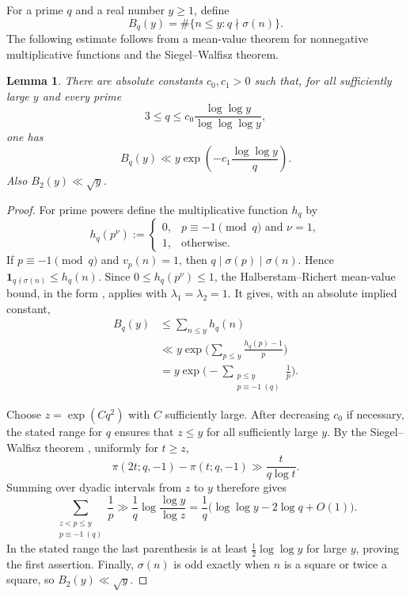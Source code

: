 \documentclass[11pt,letterpaper,reqno]{amsart}
\numberwithin{equation}{section}
\newtheorem{lemma}[theorem]{Lemma}
\theoremstyle{remark}
\newcommand{\1}{\mathbf 1}
\renewcommand{\leq}{\leqslant}
\renewcommand{\geq}{\geqslant}
\begin{document}
For a prime $q$ and a real number $y\geq1$, define
\[
 B_q(y)=\#\{n\leq y:q\nmid\sigma(n)\}.
\]
The following
estimate follows from a mean-value theorem for nonnegative multiplicative
functions and the Siegel--Walfisz theorem.

\begin{lemma}\label{lem:sigma-rate}
There are absolute constants $c_0,c_1>0$ such that, for all sufficiently
large $y$ and every prime
\[
 3\leq q\leq c_0\frac{\log\log y}{\log\log\log y},
\]
one has
\[
 B_q(y)\ll y\exp\!\left(-c_1\frac{\log\log y}q\right).
\]
Also $B_2(y)\ll\sqrt y$.
\end{lemma}

\begin{proof}
For prime powers define the multiplicative function $h_q$ by
\[
 h_q(p^\nu):=
 \begin{cases}
 0,& p\equiv-1\pmod q\text{ and }\nu=1,\\
 1,& \text{otherwise}.
 \end{cases}
\]
If $p\equiv-1\pmod q$ and $v_p(n)=1$, then
$q\mid\sigma(p)\mid\sigma(n)$. Hence
$\1_{q\nmid\sigma(n)}\leq h_q(n)$. Since $0\leq h_q(p^\nu)\leq1$,
the Halberstam--Richert mean-value bound, in the form
\cite[Lemma~2.4]{Pollack}, applies with $\lambda_1=\lambda_2=1$.
It gives, with an absolute implied constant,
\begin{align*}
 B_q(y)
 &\leq\sum_{n\leq y}h_q(n)\\
 &\ll y\exp\bigg(\sum_{p\leq y}\frac{h_q(p)-1}{p}\bigg)\\
 &=y\exp\bigg(-\sum_{\substack{p\leq y\\p\equiv-1\ (q)}}\frac1p\bigg).
\end{align*}

Choose $z=\exp(Cq^2)$ with $C$ sufficiently large. After decreasing
$c_0$ if necessary, the stated range for $q$ ensures that $z\leq y$ for
all sufficiently large $y$. By the Siegel--Walfisz theorem \cite{Tenenbaum}, uniformly for
$t\geq z$,
\[
 \pi(2t;q,-1)-\pi(t;q,-1)\gg\frac{t}{q\log t}.
\]
Summing over dyadic intervals from $z$ to $y$ therefore gives
\[
 \sum_{\substack{z<p\leq y\\p\equiv-1\ (q)}}\frac1p
 \gg \frac1q\log\frac{\log y}{\log z}
 =\frac1q\bigl(\log\log y-2\log q+O(1)\bigr).
\]
In the stated range the last parenthesis is at least
$\tfrac12\log\log y$ for large $y$, proving the first assertion.
Finally, $\sigma(n)$ is odd exactly when $n$ is a square or twice a square,
so $B_2(y)\ll\sqrt y$.
\end{proof}
\end{document}
